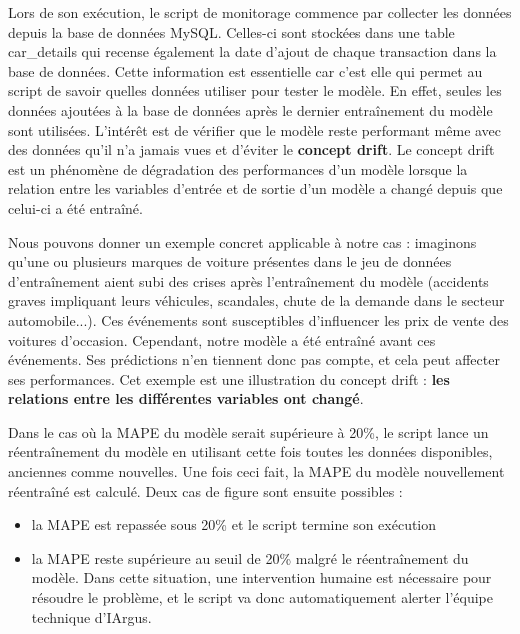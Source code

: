 \documentclass[french]{article}
\begin{document}
    Lors de son exécution, le script de monitorage commence par collecter les données depuis la base de données MySQL. Celles-ci sont stockées dans une table car\_details qui recense également la date d'ajout de chaque transaction dans la base de données. Cette information est essentielle car c'est elle qui permet au script de savoir quelles données utiliser pour tester le modèle. En effet, seules les données ajoutées à la base de données après le dernier entraînement du modèle sont utilisées. L'intérêt est de vérifier que le modèle reste performant même avec des données qu'il n'a jamais vues et d'éviter le \textbf{concept drift}. Le concept drift est un phénomène de dégradation des performances d'un modèle lorsque la relation entre les variables d'entrée et de sortie d'un modèle a changé depuis que celui-ci a été entraîné. 
    
    Nous pouvons donner un exemple concret applicable à notre cas : imaginons qu'une ou plusieurs marques de voiture présentes dans le jeu de données d'entraînement aient subi des crises après l'entraînement du modèle (accidents graves impliquant leurs véhicules, scandales, chute de la demande dans le secteur automobile...). Ces événements sont susceptibles d'influencer les prix de vente des voitures d'occasion. Cependant, notre modèle a été entraîné avant ces événements. Ses prédictions n'en tiennent donc pas compte, et cela peut affecter ses performances. Cet exemple est une illustration du concept drift : \textbf{les relations entre les différentes variables ont changé}.

    

    Dans le cas où la MAPE du modèle serait supérieure à 20\%, le script lance un réentraînement du modèle en utilisant cette fois toutes les données disponibles, anciennes comme nouvelles. Une fois ceci fait, la MAPE du modèle nouvellement réentraîné est calculé. Deux cas de figure sont ensuite possibles :
    \begin{itemize}
        \item la MAPE est repassée sous 20\% et le script termine son exécution
        \item la MAPE reste supérieure au seuil de 20\% malgré le réentraînement du modèle. Dans cette situation, une intervention humaine est nécessaire pour résoudre le problème, et le script va donc automatiquement alerter l'équipe technique d'IArgus.
    \end{itemize}
\end{document}
